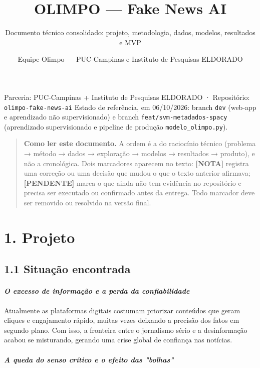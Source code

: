\documentclass[
  brazilian,
  11pt,
]{article}
\title{OLIMPO --- Fake News AI}
\subtitle{Documento técnico consolidado: projeto, metodologia, dados, modelos, resultados e MVP}
\author{Equipe Olimpo --- PUC-Campinas e Instituto de Pesquisas ELDORADO}
\date{}
\begin{document}
\maketitle

{
\setcounter{tocdepth}{3}
\tableofcontents
}
Parceria: PUC-Campinas + Instituto de Pesquisas ELDORADO · Repositório: \texttt{olimpo-fake-news-ai}
Estado de referência, em 06/10/2026: branch \texttt{dev} (web-app e aprendizado não supervisionado) e branch \texttt{feat/svm-metadados-spacy} (aprendizado supervisionado e pipeline de produção \texttt{modelo\_olimpo.py}).

\begin{quote}
\textbf{Como ler este documento.} A ordem é a do raciocínio técnico (problema → método → dados → exploração → modelos → resultados → produto), e não a cronológica. Dois marcadores aparecem no texto:
\textbf{{[}NOTA{]}} registra uma correção ou uma decisão que mudou o que o texto anterior afirmava;
\textbf{{[}PENDENTE{]}} marca o que ainda não tem evidência no repositório e precisa ser executado ou confirmado antes da entrega. Todo marcador deve ser removido ou resolvido na versão final.
\end{quote}

\section{1. Projeto}\label{projeto}

\subsection{1.1 Situação encontrada}\label{situauxe7uxe3o-encontrada}

\paragraph{\texorpdfstring{\emph{O excesso de informação e a perda da confiabilidade}}{O excesso de informação e a perda da confiabilidade}}\label{o-excesso-de-informauxe7uxe3o-e-a-perda-da-confiabilidade}

Atualmente as plataformas digitais costumam priorizar conteúdos que geram cliques e engajamento rápido, muitas vezes deixando a precisão dos fatos em segundo plano. Com isso, a fronteira entre o jornalismo sério e a desinformação acabou se misturando, gerando uma crise global de confiança nas notícias.

\paragraph{\texorpdfstring{\emph{A queda do senso crítico e o efeito das "bolhas"}}{A queda do senso crítico e o efeito das "bolhas"}}\label{a-queda-do-senso-cruxedtico-e-o-efeito-das-bolhas}
\end{document}

